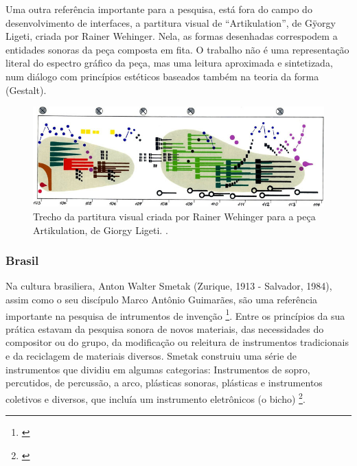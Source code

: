 Uma outra referência importante para a pesquisa, está fora do campo do desenvolvimento de interfaces, a partitura visual de ``Artikulation'', de Gÿorgy Ligeti, criada por Rainer Wehinger. Nela, as formas desenhadas correspodem a entidades sonoras da peça composta em fita. O trabalho não é uma representação literal do espectro gráfico da peça, mas uma leitura aproximada e sintetizada, num diálogo com princípios estéticos baseados também na teoria da forma (Gestalt).

\begin{figure}
    \caption{\label{ligeti}Trecho da partitura visual criada por Rainer Wehinger para a peça Artikulation, de Giorgy Ligeti.
.}
    
        \includegraphics[width=1\linewidth]{pictures/cap2/ligeti}
    
\end{figure}





\subsubsection{Brasil}
Na cultura brasiliera, Anton Walter Smetak (Zurique, 1913 - Salvador, 1984), assim como o seu discípulo Marco Antônio Guimarães, são uma referência importante na pesquisa de intrumentos de invenção \footnote{\cite{Lima2018, Multimeios2001, Obici2014}}. Entre os princípios da sua prática estavam da pesquisa sonora de novos materiais, das necessidades do compositor ou do grupo, da modificação ou releitura de instrumentos tradicionais e da reciclagem de materiais diversos. Smetak construiu uma série de instrumentos que dividiu em algumas categorias: Instrumentos de sopro, percutidos, de percussão, a arco, plásticas sonoras, plásticas e instrumentos coletivos e diversos, que incluía um instrumento eletrônicos (o bicho) \footnote{\cite{Multimeios2001}}. 

